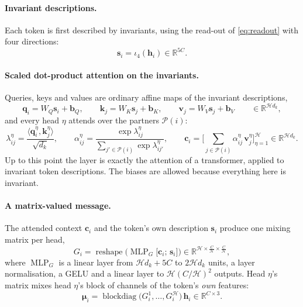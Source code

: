 \documentclass[11pt,a4paper]{article}
\theoremstyle{remark}
\newcommand{\R}{\mathbb{R}}
\newcommand{\ip}[2]{\langle #1,#2\rangle}
\DeclareMathOperator{\blockdiag}{blockdiag}
\DeclareMathOperator{\MLP}{MLP}
\begin{document}
\paragraph{Invariant descriptions.} Each token is first described by invariants, using the read-out of \cref{eq:readout} with four directions:
\begin{equation}
  \mathbf s_i=\iota_4(\mathbf h_i)\in\R^{5C}.
\end{equation}

\paragraph{Scaled dot-product attention on the invariants.} Queries, keys and values are ordinary affine maps of the invariant descriptions,
\begin{equation}
  \mathbf q_i=W_Q\mathbf s_i+\mathbf b_Q,\qquad
  \mathbf k_j=W_K\mathbf s_j+\mathbf b_K,\qquad
  \mathbf v_j=W_V\mathbf s_j+\mathbf b_V\qquad\in\R^{\mathcal Hd_k},
\end{equation}
and every head $\eta$ attends over the partners $\mathcal P(i)$:
\begin{equation}
  \lambda_{ij}^\eta=\frac{\ip{\mathbf q_i^\eta}{\mathbf k_j^\eta}}{\sqrt{d_k}},\qquad
  \alpha_{ij}^\eta=\frac{\exp\lambda_{ij}^\eta}{\sum_{j'\in\mathcal P(i)}\exp\lambda_{ij'}^\eta},\qquad
  \mathbf c_i=\Big[\sum_{j\in\mathcal P(i)}\alpha_{ij}^\eta\,\mathbf v_j^\eta\Big]_{\eta=1}^{\mathcal H}\in\R^{\mathcal Hd_k}.
\end{equation}
Up to this point the layer is exactly the attention of a transformer, applied to invariant token descriptions. The biases are allowed because everything here is invariant.

\paragraph{A matrix-valued message.} The attended context $\mathbf c_i$ and the token's own description $\mathbf s_i$ produce one mixing matrix per head,
\begin{equation}
  G_i=\operatorname{reshape}\Big(\MLP_G\big[\mathbf c_i;\,\mathbf s_i\big]\Big)\in\R^{\mathcal H\times\frac C{\mathcal H}\times\frac C{\mathcal H}},
\end{equation}
where $\MLP_G$ is a linear layer from $\mathcal Hd_k+5C$ to $2\mathcal Hd_k$ units, a layer normalisation, a GELU and a linear layer to $\mathcal H(C/\mathcal H)^2$ outputs. Head $\eta$'s matrix mixes head $\eta$'s block of channels of the token's \emph{own} features:
\begin{equation}
  \boldsymbol\mu_i=\blockdiag\big(G_i^1,\dots,G_i^{\mathcal H}\big)\,\mathbf h_i\in\R^{C\times3}.
\end{equation}
\end{document}
